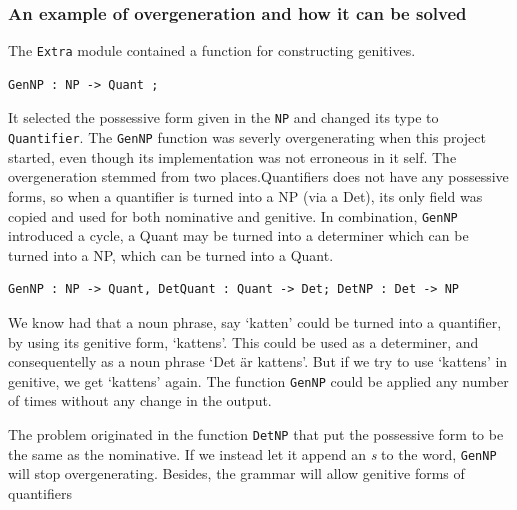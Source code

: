 \documentclass{report}
\begin{document}




\subsubsection{An example of overgeneration and how it can be solved}
The \verb-Extra- module contained a function for constructing genitives.
\begin{verbatim}GenNP : NP -> Quant ;\end{verbatim}
It selected the possessive form given in the \verb-NP- and changed its type
to \verb-Quantifier-. 
The \verb-GenNP- function was severly overgenerating when this project started, even
though its implementation was not erroneous in it self. The overgeneration stemmed
from two places.Quantifiers does not have any possessive forms, so when a quantifier is turned into
a NP (via a Det), its only field was copied and used for both nominative and genitive.
In combination, \verb-GenNP-
introduced a cycle, a Quant may
be turned into a determiner which can be turned into a NP, which can be turned
into a Quant.
\begin{verbatim}
GenNP : NP -> Quant, DetQuant : Quant -> Det; DetNP : Det -> NP
\end{verbatim}
We know had that a noun phrase, say `katten' could be turned into a quantifier,
by using its genitive form, `kattens'. This could be used as a determiner, and
consequentelly as a noun phrase `Det är kattens'. But if we try to use `kattens'
in genitive, we get `kattens' again. The function \verb-GenNP- could be applied
any number of times without any change in the output.

The problem originated in the function \verb-DetNP- that put the possessive form
to be the same as the nominative. If we instead let it append an 
\emph{s} to the word, \verb-GenNP- will stop overgenerating. Besides, the grammar 
will allow genitive forms of quantifiers
\end{document}
